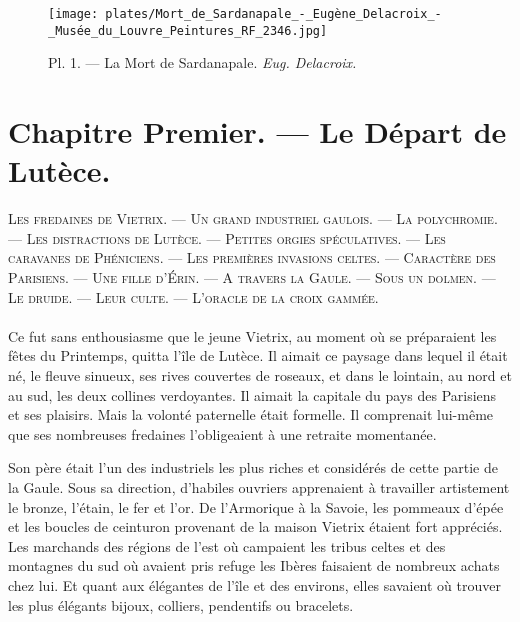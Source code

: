 \documentclass[a4paper, 11pt, oneside, polutonikogreek, french]{article}
\begin{document}
\pagestyle{fancy}
\fancyhf{}
\cfoot{\Fontauri{\thepage}}
\Large
\setlength{\parskip}{1mm plus1mm minus1mm}
\clearpage
\tableofcontents
\clearpage
\begin{landscape}
\begin{figure}[H]
\centering
\texttt{[image: plates/Mort\_de\_Sardanapale\_-\_Eugène\_Delacroix\_-\_Musée\_du\_Louvre\_Peintures\_RF\_2346.jpg]}
\caption{\Fontauri Pl. 1. --- La Mort de Sardanapale. \emph{Eug. Delacroix.}}
\end{figure}
\end{landscape}
\clearpage
\section{Chapitre Premier. --- Le Départ de Lutèce.}
\begin{center}
\scshape
\small
Les fredaines de Vietrix. --- Un grand industriel gaulois. --- La polychromie. --- Les distractions de Lutèce. --- Petites orgies spéculatives. --- Les caravanes de Phéniciens. --- Les premières invasions celtes. --- Caractère des Parisiens. --- Une fille d'Érin. --- A travers la Gaule. --- Sous un dolmen. --- Le druide. --- Leur culte. --- L'oracle de la croix gammée.
\end{center}
\paragraph{}
Ce fut sans enthousiasme que le jeune Vietrix, au moment où se préparaient les fêtes du Printemps, quitta l'île de Lutèce. Il aimait ce paysage dans lequel il était né, le fleuve sinueux, ses rives couvertes de roseaux, et dans le lointain, au nord et au sud, les deux collines verdoyantes. Il aimait la capitale du pays des Parisiens et ses plaisirs. Mais la volonté paternelle était formelle. Il comprenait lui-même que ses nombreuses fredaines l'obligeaient à une retraite momentanée.

Son père était l'un des industriels les plus riches et considérés de cette partie de la Gaule. Sous sa direction, d'habiles ouvriers apprenaient à travailler artistement le bronze, l'étain, le fer et l'or. De l'Armorique à la Savoie, les pommeaux d'épée et les boucles de ceinturon provenant de la maison Vietrix étaient fort appréciés. Les marchands des régions de l'est où campaient les tribus celtes et des montagnes du sud où avaient pris refuge les Ibères faisaient de nombreux achats chez lui. Et quant aux élégantes de l'île et des environs, elles savaient où trouver les plus élégants bijoux, colliers, pendentifs ou bracelets.
\end{document}
